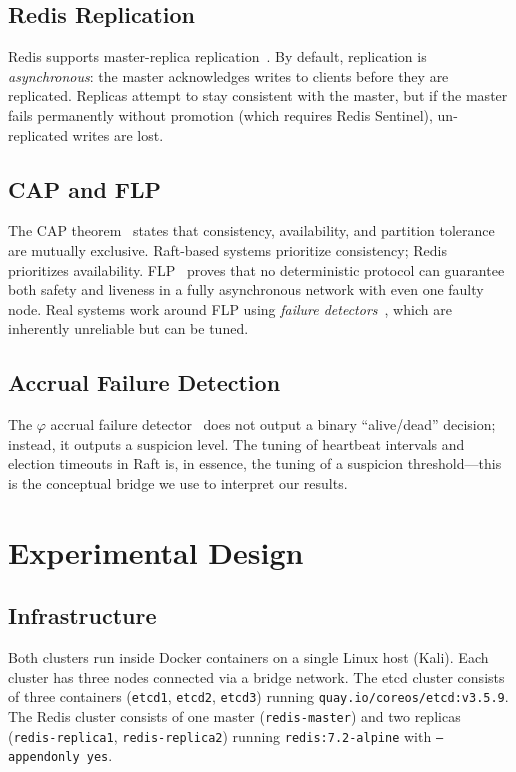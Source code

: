 \documentclass[conference]{IEEEtran}
\begin{document}
\subsection{Redis Replication}
Redis supports master-replica replication~\cite{redis2024replication}. By default, replication is \textit{asynchronous}: the master acknowledges writes to clients before they are replicated. Replicas attempt to stay consistent with the master, but if the master fails permanently without promotion (which requires Redis Sentinel), un-replicated writes are lost.

\subsection{CAP and FLP}
The CAP theorem~\cite{gilbert2002brewer} states that consistency, availability, and partition tolerance are mutually exclusive. Raft-based systems prioritize consistency; Redis prioritizes availability. FLP~\cite{fischer1985impossibility} proves that no deterministic protocol can guarantee both safety and liveness in a fully asynchronous network with even one faulty node. Real systems work around FLP using \textit{failure detectors}~\cite{chandra1996unreliable}, which are inherently unreliable but can be tuned.

\subsection{Accrual Failure Detection}
The $\varphi$ accrual failure detector~\cite{hayashibara2004phi} does not output a binary ``alive/dead'' decision; instead, it outputs a suspicion level. The tuning of heartbeat intervals and election timeouts in Raft is, in essence, the tuning of a suspicion threshold---this is the conceptual bridge we use to interpret our results.

\section{Experimental Design}

\subsection{Infrastructure}
Both clusters run inside Docker containers on a single Linux host (Kali). Each cluster has three nodes connected via a bridge network. The etcd cluster consists of three containers (\texttt{etcd1}, \texttt{etcd2}, \texttt{etcd3}) running \texttt{quay.io/coreos/etcd:v3.5.9}. The Redis cluster consists of one master (\texttt{redis-master}) and two replicas (\texttt{redis-replica1}, \texttt{redis-replica2}) running \texttt{redis:7.2-alpine} with \texttt{--appendonly yes}.
\end{document}
